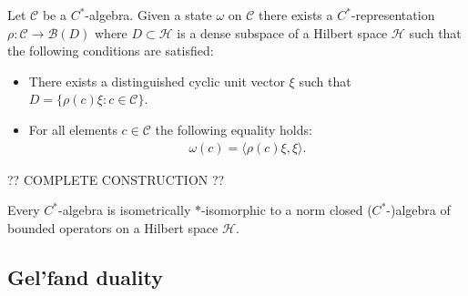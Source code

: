 
    \begin{construct}\label{operators:gns}
        Let $\mathcal{C}$ be a $C^*$-algebra. Given a state $\omega$ on $\mathcal{C}$ there exists a $C^*$-representation $\rho:\mathcal{C}\rightarrow\mathcal{B}(D)$ where $D\subset\mathcal{H}$ is a dense subspace of a Hilbert space $\mathcal{H}$ such that the following conditions are satisfied:
        \begin{itemize}
            \item There exists a distinguished cyclic unit vector $\xi$ such that $D = \{\rho(c)\xi: c\in\mathcal{C}\}$.
            \item For all elements $c\in\mathcal{C}$ the following equality holds:
            \begin{gather}
                \omega(c) = \langle \rho(c)\xi,\xi \rangle.
            \end{gather}
        \end{itemize}

        ?? COMPLETE CONSTRUCTION ??
    \end{construct}

    \begin{theorem}
        Every $C^*$-algebra is isometrically $\ast$-isomorphic to a norm closed ($C^*$-)algebra of bounded operators on a Hilbert space $\mathcal{H}$.
    \end{theorem}

\subsection{Gel'fand duality}

